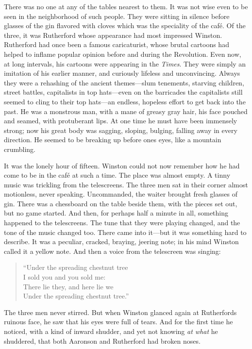 There was no one at any of the tables nearest to them. It was not wise
even to be seen in the neighborhood of such people. They were sitting in
silence before glasses of the gin flavored with cloves which was the
speciality of the café. Of the three, it was Rutherford whose appearance
had most impressed Winston. Rutherford had once been a famous
caricaturist, whose brutal cartoons had helped to inflame popular
opinion before and during the Revolution. Even now, at long intervals,
his cartoons were appearing in the \emph{Times}. They were simply an
imitation of his earlier manner, and curiously lifeless and
unconvincing. Always they were a rehashing of the ancient themes---slum
tenements, starving children, street battles, capitalists in top
hats---even on the barricades the capitalists still seemed to cling to
their top hats---an endless, hopeless effort to get back into the past.
He was a monstrous man, with a mane of greasy gray hair, his face
pouched and seamed, with protuberant lips. At one time he must have been
immensely strong; now his great body was sagging, sloping, bulging,
falling away in every direction. He seemed to be breaking up before
one\textquotesingle s eyes, like a mountain crumbling.

It was the lonely hour of fifteen. Winston could not now remember how he
had come to be in the café at such a time. The place was almost empty. A
tinny music was trickling from the telescreens. The three men sat in
their corner almost motionless, never speaking. Uncommanded, the waiter
brought fresh glasses of gin. There was a chessboard on the table beside
them, with the pieces set out, but no game started. And then, for
perhaps half a minute in all, something happened to the telescreens. The
tune that they were playing changed, and the tone of the music changed
too. There came into it---but it was something hard to describe. It was
a peculiar, cracked, braying, jeering note; in his mind Winston called
it a yellow note. And then a voice from the telescreen was singing:

\begin{quotation}
  \noindent ``Under the spreading chestnut tree\\
  I sold you and you sold me:\\
  There lie they, and here lie we\\
  Under the spreading chestnut tree.''
\end{quotation}

The three men never stirred. But when Winston glanced again at
Rutherford\textquotesingle s ruinous face, he saw that his eyes were
full of tears. And for the first time he noticed, with a kind of inward
shudder, and yet not knowing \emph{at what} he shuddered, that both
Aaronson and Rutherford had broken noses.

